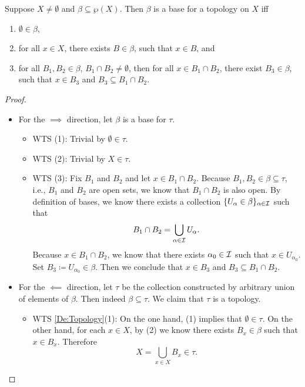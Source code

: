 \documentclass[screen]{techreport}
\numberwithin{equation}{section}
\begin{document}
\begin{proposition}\label{Prop:BaseStructure}
	Suppose $X \neq \emptyset$ and $\beta \subseteq \wp(X)$.
	Then $\beta$ is a base for a topology on $X$ iff
	\begin{enumerate}
		\item $\emptyset \in \beta$,
		\item for all $x \in X$, there exists $B \in \beta$, such that $x \in B$, and
		\item for all $B_1,B_2 \in \beta$, $B_1 \cap B_2 \neq \emptyset$, then for all $x \in B_1 \cap B_2$, there exist $B_3 \in \beta$, such that $x \in B_3$ and $B_3 \subseteq B_1 \cap B_2$.
	\end{enumerate}
\end{proposition}
\begin{proof}\
	\begin{itemize}
		\item For the ${\implies}$ direction, let $\beta$ is a base for $\tau$.
		\begin{itemize}
			\item WTS (1): Trivial by $\emptyset \in \tau$.
			\item WTS (2): Trivial by $X \in \tau$.
			\item WTS (3): Fix $B_1$ and $B_2$ and let $x \in B_1 \cap B_2$.
			Because $B_1,B_2 \in \beta \subseteq \tau$, i.e., $B_1$ and $B_2$ are open sets, we know that $B_1 \cap B_2$ is also open.
			By definition of bases, we know there exists a collection $\{U_\alpha \in \beta\}_{\alpha \in \mathcal{I}}$ such that
			\[
			B_1 \cap B_2 = \bigcup_{\alpha \in \mathcal{I}} U_\alpha.
			\]
			Because $x \in B_1 \cap B_2$, we know that there exists $\alpha_0 \in \mathcal{I}$ such that $x \in U_{\alpha_0}$.
			Set $B_3 \coloneqq U_{\alpha_0} \in \beta$.
			Then we conclude that $x \in B_3$ and $B_3 \subseteq B_1 \cap B_2$.
		\end{itemize}
		
		\item For the ${\impliedby}$ direction, let $\tau$ be the collection constructed by arbitrary union of elements of $\beta$.
		Then indeed $\beta \subseteq \tau$.
		We claim that $\tau$ is a topology.
		\begin{itemize}
			\item WTS \cref{De:Topology}(1): On the one hand, (1) implies that $\emptyset \in \tau$.
			On the other hand, for each $x \in X$, by (2) we know there exists $B_x \in \beta$ such that $x \in B_x$.
			Therefore
			\[
			X = \bigcup_{x \in X} B_x \in \tau.
			\]
			

\end{itemize}
\end{itemize}
\end{proof}
\end{document}

